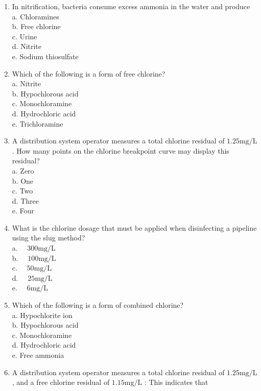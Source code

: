 \documentclass{article}
\begin{document}
\begin{enumerate}
\item In nitrification, bacteria consume excess ammonia in the water and produce\\
a. Chloramines\\
b. Free chlorine\\
c. Urine\\
d. Nitrite\\
e. Sodium thiosulfate\\
  \item Which of the following is a form of free chlorine?\\
a. Nitrite\\
b. Hypochlorous acid\\
c. Monochloramine\\
d. Hydrochloric acid\\
e. Trichloramine\\
  \item A distribution system operator measures a total chlorine residual of $1.25 \mathrm{mg} / \mathrm{L}$. How many points on the chlorine breakpoint curve may display this residual?\\
a. Zero\\
b. One\\
c. Two\\
d. Three\\
e. Four\\
  \item What is the chlorine dosage that must be applied when disinfecting a pipeline using the slug method?\\
a. $\quad 300 \mathrm{mg} / \mathrm{L}$\\
b. $\quad 100 \mathrm{mg} / \mathrm{L}$\\
c. $\quad 50 \mathrm{mg} / \mathrm{L}$\\
d. $\quad 25 \mathrm{mg} / \mathrm{L}$\\
e. $\quad 6 \mathrm{mg} / \mathrm{L}$ \\
\item Which of the following is a form of combined chlorine?\\
a. Hypochlorite ion\\
b. Hypochlorous acid\\
c. Monochloramine\\
d. Hydrochloric acid\\
e. Free ammonia\\
 \item A distribution system operator measures a total chlorine residual of $1.25 \mathrm{mg} / \mathrm{L}$, and a free chlorine residual of $1.15 \mathrm{mg} / \mathrm{L}$ : This indicates that\\

\end{enumerate}
\end{document}
